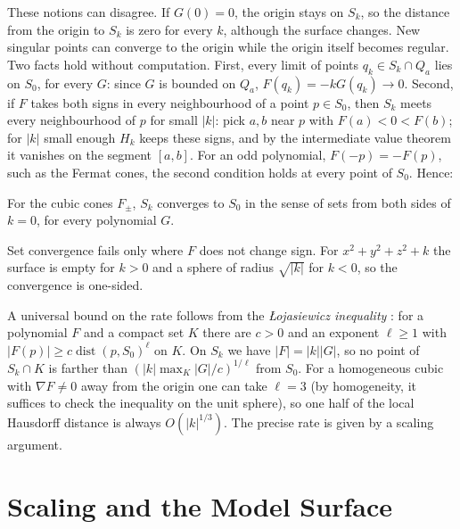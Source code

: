 These notions can disagree. If $G(0)=0$, the origin stays on $S_k$, so the
distance from the origin to $S_k$ is zero for every $k$, although the surface
changes. New singular points can converge to the origin while the origin
itself becomes regular. Two facts hold without computation. First, every
limit of points $q_k\in S_k\cap Q_a$ lies on $S_0$, for every $G$: since $G$
is bounded on $Q_a$, $F(q_k)=-kG(q_k)\to0$. Second, if $F$ takes both signs
in every neighbourhood of a point $p\in S_0$, then $S_k$ meets every
neighbourhood of $p$ for small $|k|$: pick $a,b$ near $p$ with
$F(a)<0<F(b)$; for $|k|$ small enough $H_k$ keeps these signs, and by the
intermediate value theorem it vanishes on the segment $[a,b]$. For an odd
polynomial, $F(-p)=-F(p)$, such as the Fermat cones, the second condition holds
at every point of $S_0$. Hence:

\begin{proposition}
\label{prop:set-convergence}
For the cubic cones $F_\pm$, $S_k$ converges to $S_0$ in the sense of sets from
both sides of $k=0$, for every polynomial $G$.
\end{proposition}

Set convergence fails only where $F$ does not change sign. For
$x^2+y^2+z^2+k$ the surface is empty for $k>0$ and a sphere of radius
$\sqrt{|k|}$ for $k<0$, so the convergence is one-sided.

A universal bound on the rate follows from the \emph{Łojasiewicz inequality}
\cite{lojasiewicz1959division,bochnak1998real}: for a polynomial $F$ and a
compact set $K$ there are $c>0$ and an exponent $\ell\ge1$ with
$|F(p)|\ge c\operatorname{dist}(p,S_0)^\ell$ on $K$. On $S_k$ we have
$|F|=|k||G|$, so no point of $S_k\cap K$ is farther than
$(|k|\max_K|G|/c)^{1/\ell}$ from $S_0$. For a homogeneous cubic with
$\nabla F\neq0$ away from the origin one can take $\ell=3$ (by homogeneity,
it suffices to check the inequality on the unit sphere), so one half of the
local Hausdorff distance is always $O(|k|^{1/3})$. The precise rate is given
by a scaling argument.

\section{Scaling and the Model Surface}
\label{sec:scaling}

